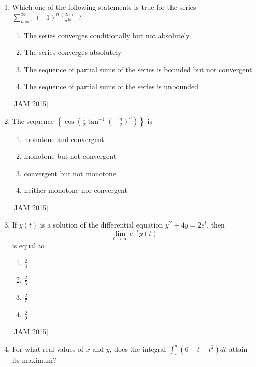 \begin{enumerate}
\item 

Which one of the following statements is true for the series $\sum_{n=1}^{\infty}(-1)^{n} \frac{(2 n) !}{n^{2 n}}$ ? 
\begin{enumerate}
    \item The series converges conditionally but not absolutely 
\item The series converges absolutely 
\item The sequence of partial sums of the series is bounded but not convergent 
\item The sequence of partial sums of the series is unbounded

\end{enumerate}
\hfill [JAM 2015]




\item  

The sequence $\left\{\cos \left(\frac{1}{2} \tan ^{-1}\left(-\frac{n}{2}\right)^{n}\right)\right\}$ is 

\begin{enumerate}
    \item monotone and convergent 
\item monotone but not convergent 
\item convergent but not monotone 
\item neither monotone nor convergent
\end{enumerate}
\hfill [JAM 2015]





\item  

If $y(t)$ is a solution of the differential equation $y^{\prime \prime}+4 y=2 e^{t}$, then
$$
\lim _{t \rightarrow \infty} e^{-t} y(t)
$$
is equal to

\begin{enumerate}
    
\item $\frac{2}{3}$ 
\item $\frac{2}{5}$ 
\item $\frac{2}{7}$ 
\item $\frac{2}{9}$
\end{enumerate}
\hfill [JAM 2015]




\item  

For what real values of $x$ and $y$, does the integral $\int_{x}^{y}\left(6-t-t^{2}\right) d t$ attain its maximum? 


\end{enumerate}
